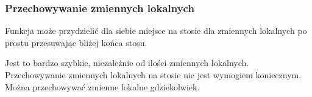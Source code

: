 \subsubsection{Przechowywanie zmiennych lokalnych}

Funkcja może przydzielić dla siebie miejsce na stosie dla zmiennych lokalnych po prostu przesuwając 
 bliżej końca stosu.


Jest to bardzo szybkie, niezależnie od ilości zmiennych lokalnych.
Przechowywanie zmiennych lokalnych na stosie nie jest wymogiem koniecznym. 
Można przechowywać zmienne lokalne gdziekolwiek. 


